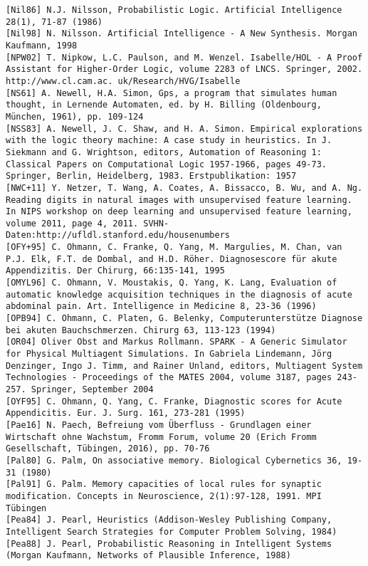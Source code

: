 \documentclass[10pt]{article}
\begin{document}
\begin{verbatim}
[Nil86] N.J. Nilsson, Probabilistic Logic. Artificial Intelligence 28(1), 71-87 (1986)
[Nil98] N. Nilsson. Artificial Intelligence - A New Synthesis. Morgan Kaufmann, 1998
[NPW02] T. Nipkow, L.C. Paulson, and M. Wenzel. Isabelle/HOL - A Proof Assistant for Higher-Order Logic, volume 2283 of LNCS. Springer, 2002. http://www.cl.cam.ac. uk/Research/HVG/Isabelle
[NS61] A. Newell, H.A. Simon, Gps, a program that simulates human thought, in Lernende Automaten, ed. by H. Billing (Oldenbourg, München, 1961), pp. 109-124
[NSS83] A. Newell, J. C. Shaw, and H. A. Simon. Empirical explorations with the logic theory machine: A case study in heuristics. In J. Siekmann and G. Wrightson, editors, Automation of Reasoning 1: Classical Papers on Computational Logic 1957-1966, pages 49-73. Springer, Berlin, Heidelberg, 1983. Erstpublikation: 1957
[NWC+11] Y. Netzer, T. Wang, A. Coates, A. Bissacco, B. Wu, and A. Ng. Reading digits in natural images with unsupervised feature learning. In NIPS workshop on deep learning and unsupervised feature learning, volume 2011, page 4, 2011. SVHN-Daten:http://ufldl.stanford.edu/housenumbers
[OFY+95] C. Ohmann, C. Franke, Q. Yang, M. Margulies, M. Chan, van P.J. Elk, F.T. de Dombal, and H.D. Röher. Diagnosescore für akute Appendizitis. Der Chirurg, 66:135-141, 1995
[OMYL96] C. Ohmann, V. Moustakis, Q. Yang, K. Lang, Evaluation of automatic knowledge acquisition techniques in the diagnosis of acute abdominal pain. Art. Intelligence in Medicine 8, 23-36 (1996)
[OPB94] C. Ohmann, C. Platen, G. Belenky, Computerunterstütze Diagnose bei akuten Bauchschmerzen. Chirurg 63, 113-123 (1994)
[OR04] Oliver Obst and Markus Rollmann. SPARK - A Generic Simulator for Physical Multiagent Simulations. In Gabriela Lindemann, Jörg Denzinger, Ingo J. Timm, and Rainer Unland, editors, Multiagent System Technologies - Proceedings of the MATES 2004, volume 3187, pages 243-257. Springer, September 2004
[OYF95] C. Ohmann, Q. Yang, C. Franke, Diagnostic scores for Acute Appendicitis. Eur. J. Surg. 161, 273-281 (1995)
[Pae16] N. Paech, Befreiung vom Überfluss - Grundlagen einer Wirtschaft ohne Wachstum, Fromm Forum, volume 20 (Erich Fromm Gesellschaft, Tübingen, 2016), pp. 70-76
[Pal80] G. Palm, On associative memory. Biological Cybernetics 36, 19-31 (1980)
[Pal91] G. Palm. Memory capacities of local rules for synaptic modification. Concepts in Neuroscience, 2(1):97-128, 1991. MPI Tübingen
[Pea84] J. Pearl, Heuristics (Addison-Wesley Publishing Company, Intelligent Search Strategies for Computer Problem Solving, 1984)
[Pea88] J. Pearl, Probabilistic Reasoning in Intelligent Systems (Morgan Kaufmann, Networks of Plausible Inference, 1988)

\end{verbatim}
\end{document}
